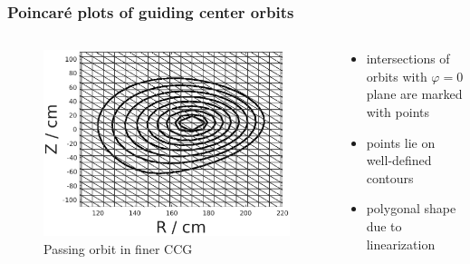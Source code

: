\documentclass{beamer}
\begin{document}
\begin{frame}
\frametitle{Poincaré plots of guiding center orbits}
\vspace{-0.75 cm}
\begin{columns}[onlytextwidth]
	\begin{column}{0.55\textwidth}
		\begin{center}
			\begin{figure}
				\includegraphics[trim={0cm 0cm 0cm 0cm},clip,width=1\textwidth]{FIGURES/field_lines_fine_rect_grid.eps}
				\caption{Passing orbit in finer CCG}
			\end{figure}
		\end{center}
	\end{column}
	\begin{column}{0.45\textwidth}
		\vspace{0 cm}
		\begin{center}
			\begin{itemize}
				\item intersections of orbits with $\varphi=0$ plane are marked with points
				\item points lie on well-defined contours
				\item polygonal shape due to linearization 
			\end{itemize}
		\end{center}
	\end{column}
\end{columns}
\end{frame}
\end{document}
